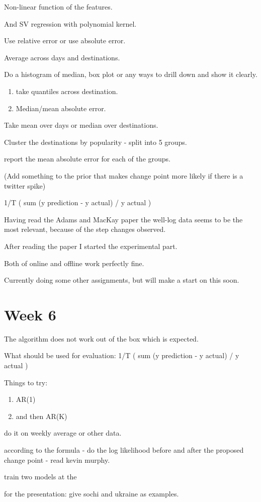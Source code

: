 \documentclass[11pt]{amsart}
\begin{document}
Non-linear function of the features.

And SV regression with polynomial kernel.

Use relative error or use absolute error.

Average across days and destinations. 

Do a histogram of median, box plot or any ways to drill down and show it clearly.
\begin{enumerate}
\item take quantiles across destination. 
\item Median/mean absolute error.
\end{enumerate}

Take mean over days or median over destinations.

Cluster the destinations by popularity - split into 5 groups.

report the mean absolute error for each of the groups.

(Add something to the prior that makes change point more likely if there is a twitter spike)

1/T ( sum (y prediction - y actual) / y actual )


Having read the Adams and MacKay paper the well-log data seems to be the most relevant, because of the step changes observed.

After reading the paper I started the experimental part. 

Both of online and offline work perfectly fine.

Currently doing some other assignments, but will make a start on this soon.

\section{Week 6}

The algorithm does not work out of the box which is expected. 

What should be used for evaluation: 1/T ( sum (y prediction - y actual) / y actual )

Things to try:

\begin{enumerate}
\item AR(1)
\item and then AR(K)
\end{enumerate}

do it on weekly average or other data.



according to the formula - do the log likelihood before and after the proposed change point - read kevin murphy.

train two models at the 


for the presentation: give sochi and ukraine as examples.
\end{document}
